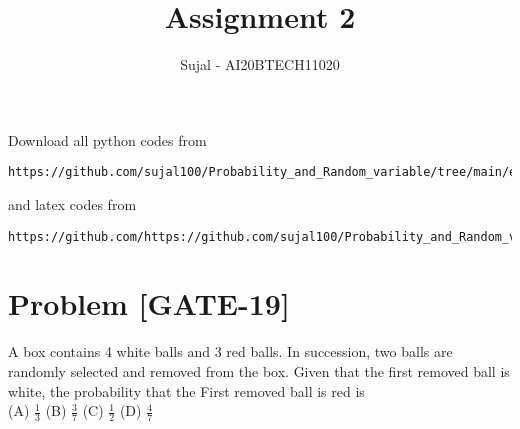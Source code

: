 \documentclass[journal,12pt,twocolumn]{IEEEtran}
\begin{document}
\let\StandardTheFigure\thefigure
\let\vec\mathbf
\renewcommand{\thefigure}{\theproblem}
\def\putbox#1#2#3{\makebox[0in][l]{\makebox[#1][l]{}\raisebox{\baselineskip}[0in][0in]{\raisebox{#2}[0in][0in]{#3}}}}
     \def\rightbox#1{\makebox[0in][r]{#1}}
     \def\centbox#1{\makebox[0in]{#1}}
     \def\topbox#1{\raisebox{-\baselineskip}[0in][0in]{#1}}
     \def\midbox#1{\raisebox{-0.5\baselineskip}[0in][0in]{#1}}
\vspace{3cm}
\title{Assignment 2}
\author{Sujal - AI20BTECH11020}
\maketitle
\newpage
\bigskip
\renewcommand{\thefigure}{\theenumi}
\renewcommand{\thetable}{\theenumi}
Download all python codes from 
\begin{lstlisting}
https://github.com/sujal100/Probability_and_Random_variable/tree/main/exercise_2/codes
\end{lstlisting}

and latex codes from 

\begin{lstlisting}
https://github.com/https://github.com/sujal100/Probability_and_Random_variable/blob/main/exercise_2/exercise_2_main_tex.tex
\end{lstlisting}
\section{Problem [GATE-19]}
A box contains 4 white balls and 3 red balls. In succession, two balls are randomly selected and removed from the box. Given that the first removed ball is white, the probability that the First removed ball is red is\\
(A) $\frac{1}{3}$
(B) $\frac{3}{7}$
(C) $\frac{1}{2}$
(D) $\frac{4}{7}$
\end{document}
